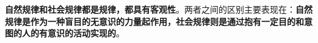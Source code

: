 \textbf{自然规律和社会规律都是规律，都具有客观性}{。两者之间的区别主要表现在：}\textbf{自然规律是作为一种盲目的无意识的力量起作用，社会规律则是通过抱有一定目的和意图的人的有意识的活动实现的}{。}

{}
